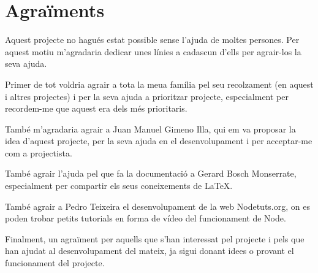 \chapter*{Agraïments}

Aquest projecte no hagués estat possible sense l'ajuda de moltes persones. Per aquest motiu m'agradaria dedicar unes línies a cadascun d'ells per agrair-los la seva ajuda.

Primer de tot voldria agrair a tota la meua família pel seu recolzament (en aquest i altres projectes) i per la seva ajuda a prioritzar projecte, especialment per recordem-me que aquest era dels més prioritaris. 

També m'agradaria agrair a Juan Manuel Gimeno Illa, qui em va proposar la idea d'aquest projecte, per la seva ajuda en el desenvolupament i per acceptar-me com a projectista. 

També agrair l'ajuda pel que fa la documentació a Gerard Bosch Monserrate, especialment per compartir els seus coneixements de \LaTeX.

També agrair a Pedro Teixeira el desenvolupament de la web Nodetuts.org, on es poden trobar petits tutorials en forma de vídeo del funcionament de Node.

Finalment, un agraïment per aquells que s'han interessat pel projecte i pels que han ajudat al desenvolupament del mateix, ja sigui donant idees o provant el funcionament del projecte. 

